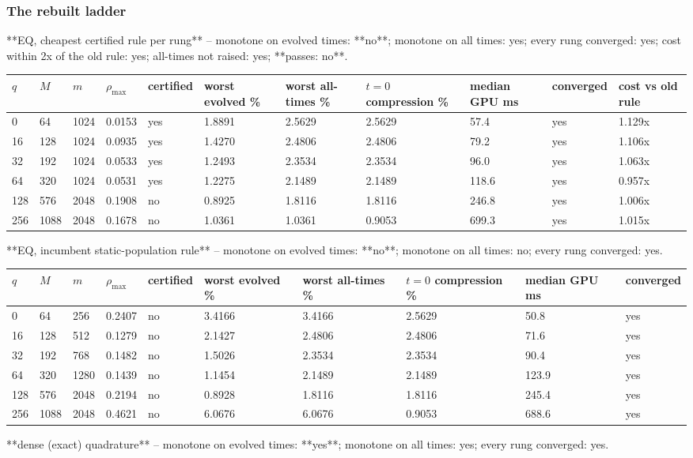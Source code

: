 \documentclass[11pt]{article}
\begin{document}
\subsubsection{The rebuilt ladder}
**EQ, cheapest certified rule per rung** -- monotone on evolved times: **no**; monotone on all times: yes; every rung converged: yes; cost within 2x of the old rule: yes; all-times not raised: yes; **passes: no**.

\begin{table}[htbp]\centering\small
\begin{tabular}{lllllllllll}\hline
$q$ & $M$ & $m$ & $\rho_{\max}$ & certified & worst evolved \% & worst all-times \% & $t=0$ compression \% & median GPU ms & converged & cost vs old rule \\ \hline
0 & 64 & 1024 & 0.0153 & yes & 1.8891 & 2.5629 & 2.5629 & 57.4 & yes & 1.129x \\
16 & 128 & 1024 & 0.0935 & yes & 1.4270 & 2.4806 & 2.4806 & 79.2 & yes & 1.106x \\
32 & 192 & 1024 & 0.0533 & yes & 1.2493 & 2.3534 & 2.3534 & 96.0 & yes & 1.063x \\
64 & 320 & 1024 & 0.0531 & yes & 1.2275 & 2.1489 & 2.1489 & 118.6 & yes & 0.957x \\
128 & 576 & 2048 & 0.1908 & no & 0.8925 & 1.8116 & 1.8116 & 246.8 & yes & 1.006x \\
256 & 1088 & 2048 & 0.1678 & no & 1.0361 & 1.0361 & 0.9053 & 699.3 & yes & 1.015x \\
\hline\end{tabular}
\end{table}
**EQ, incumbent static-population rule** -- monotone on evolved times: **no**; monotone on all times: no; every rung converged: yes.

\begin{table}[htbp]\centering\small
\begin{tabular}{llllllllll}\hline
$q$ & $M$ & $m$ & $\rho_{\max}$ & certified & worst evolved \% & worst all-times \% & $t=0$ compression \% & median GPU ms & converged \\ \hline
0 & 64 & 256 & 0.2407 & no & 3.4166 & 3.4166 & 2.5629 & 50.8 & yes \\
16 & 128 & 512 & 0.1279 & no & 2.1427 & 2.4806 & 2.4806 & 71.6 & yes \\
32 & 192 & 768 & 0.1482 & no & 1.5026 & 2.3534 & 2.3534 & 90.4 & yes \\
64 & 320 & 1280 & 0.1439 & no & 1.1454 & 2.1489 & 2.1489 & 123.9 & yes \\
128 & 576 & 2048 & 0.2194 & no & 0.8928 & 1.8116 & 1.8116 & 245.4 & yes \\
256 & 1088 & 2048 & 0.4621 & no & 6.0676 & 6.0676 & 0.9053 & 688.6 & yes \\
\hline\end{tabular}
\end{table}
**dense (exact) quadrature** -- monotone on evolved times: **yes**; monotone on all times: yes; every rung converged: yes.
\end{document}
